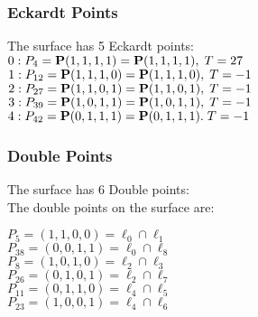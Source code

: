 \documentclass{article}
\newcommand{\bP}{{\bf P}}
\begin{document}
{\subsubsection*{Eckardt Points}
The surface has 5 Eckardt points:\\
$0 : P_{4}=\bP(1, 1, 1, 1) = \bP(1, 1, 1, 1),\; T= 27$\\
$1 : P_{12}=\bP(1, 1, 1, 0) = \bP(1, 1, 1, 0),\; T= -1$\\
$2 : P_{27}=\bP(1, 1, 0, 1) = \bP(1, 1, 0, 1),\; T= -1$\\
$3 : P_{39}=\bP(1, 0, 1, 1) = \bP(1, 0, 1, 1),\; T= -1$\\
$4 : P_{42}=\bP(0, 1, 1, 1) = \bP(0, 1, 1, 1).\; T= -1$\\
\subsubsection*{Double Points}
The surface has 6 Double points:\\
The double points on the surface are:\\
\begin{multicols}{2}
\noindent
$P_{5} = ( 1, 1, 0, 0 ) = \ell_{0} \cap \ell_{1} $\\
$P_{38} = ( 0, 0, 1, 1 ) = \ell_{0} \cap \ell_{8} $\\
$P_{8} = ( 1, 0, 1, 0 ) = \ell_{2} \cap \ell_{3} $\\
$P_{26} = ( 0, 1, 0, 1 ) = \ell_{2} \cap \ell_{7} $\\
$P_{11} = ( 0, 1, 1, 0 ) = \ell_{4} \cap \ell_{5} $\\
$P_{23} = ( 1, 0, 0, 1 ) = \ell_{4} \cap \ell_{6} $\\
\end{multicols}
}
\end{document}
